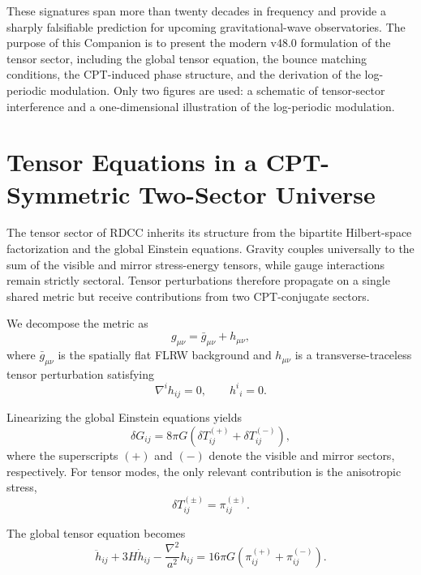\documentclass[11pt,a4paper]{article}
\begin{document}
These signatures span more than twenty decades in frequency and provide a sharply
falsifiable prediction for upcoming gravitational-wave observatories. The purpose of this
Companion is to present the modern v48.0 formulation of the tensor sector, including
the global tensor equation, the bounce matching conditions, the CPT-induced phase
structure, and the derivation of the log-periodic modulation. Only two figures are used:
a schematic of tensor-sector interference and a one-dimensional illustration of the
log-periodic modulation.

\section{Tensor Equations in a CPT-Symmetric Two-Sector Universe}

The tensor sector of RDCC inherits its structure from the bipartite Hilbert-space
factorization and the global Einstein equations. Gravity couples universally to the sum
of the visible and mirror stress-energy tensors, while gauge interactions remain strictly
sectoral. Tensor perturbations therefore propagate on a single shared metric but receive
contributions from two CPT-conjugate sectors.

We decompose the metric as
\begin{equation}
    g_{\mu\nu} = \bar{g}_{\mu\nu} + h_{\mu\nu},
\end{equation}
where $\bar{g}_{\mu\nu}$ is the spatially flat FLRW background and $h_{\mu\nu}$ is a
transverse-traceless tensor perturbation satisfying
\begin{equation}
    \nabla^{i} h_{ij} = 0,
    \qquad
    h^{i}{}_{i} = 0.
\end{equation}

Linearizing the global Einstein equations yields
\begin{equation}
    \delta G_{ij}
    = 8\pi G \left( \delta T^{(+)}_{ij} + \delta T^{(-)}_{ij} \right),
\end{equation}
where the superscripts $(+)$ and $(-)$ denote the visible and mirror sectors,
respectively. For tensor modes, the only relevant contribution is the anisotropic stress,
\begin{equation}
    \delta T^{(\pm)}_{ij} = \pi^{(\pm)}_{ij}.
\end{equation}

The global tensor equation becomes
\begin{equation}
    \ddot{h}_{ij} + 3H \dot{h}_{ij} - \frac{\nabla^{2}}{a^{2}} h_{ij}
    = 16\pi G \left( \pi^{(+)}_{ij} + \pi^{(-)}_{ij} \right).
\end{equation}
\end{document}
